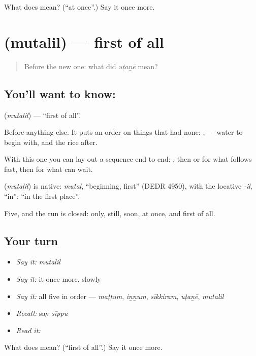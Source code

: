 \begin{tcolorbox}[breakable,colback=teal!4,colframe=teal!35!black,title={Before you move on}]
What does  mean? (\textquotedblleft{}at once\textquotedblright{}.) Say it once more.
\end{tcolorbox}
\section[\texorpdfstring{\ta{முதலில்} (mutalil)}{முதலில் (mutalil)}]{ (mutalil) — first of all}

\label{lesson:TA-C62-first-of-all}



\begin{quote}
Before the new one: what did \emph{uṭaṉē} mean?
\end{quote}

\subsection*{You'll want to know: }
\textbf{} (\emph{mutalil}) — \textquotedblleft{}first of all\textquotedblright{}.

Before anything else. It puts an order on things that had none:  ,   — water to begin with, and the rice after.

With this one you can lay out a sequence end to end: , then  or  for what follows fast, then  for what can wait.

\begin{cousinweb}
\textbf{} (\emph{mutalil}) is native: \emph{mutal}, \textquotedblleft{}beginning, first\textquotedblright{} (DEDR 4950), with the locative \emph{-il}, \textquotedblleft{}in\textquotedblright{}: \textquotedblleft{}in the first place\textquotedblright{}.
\end{cousinweb}

\begin{grammarlens}[title={What you've built}]
Five, and the run is closed: only, still, soon, at once, and first of all.
\end{grammarlens}

\subsection*{Your turn}
\begin{itemize}
\raggedright
  \item \emph{Say it:} \emph{mutalil}
  \item \emph{Say it:} it once more, slowly
  \item \emph{Say it:} all five in order — \emph{maṭṭum}, \emph{iṉṉum}, \emph{sīkkiram}, \emph{uṭaṉē}, \emph{mutalil}
  \item \emph{Recall:} say \emph{sīppu}
  \item \emph{Read it:} \textbf{}
\end{itemize}

\begin{tcolorbox}[breakable,colback=teal!4,colframe=teal!35!black,title={Before you move on}]
What does  mean? (\textquotedblleft{}first of all\textquotedblright{}.) Say it once more.
\end{tcolorbox}
